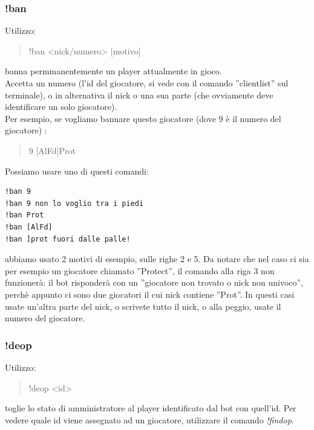 \documentclass[a4paper]{article}
\begin{document}
\subsubsection{!ban}
Utilizzo:
\begin{quote}
!ban \textless{}nick/numero\textgreater{} [motivo]
\end{quote}
banna permmanentemente un player attualmente in gioco.\\
Accetta un numero (l'id del giocatore, si vede con il comando ''clientlist'' sul terminale), o in alternativa il nick o una sua parte (che ovviamente deve identificare un solo giocatore).\\
Per esempio, se vogliamo bannare questo giocatore (dove 9 \`e il numero del giocatore) :
\begin{quote}
9 [AlFd]Prot
\end{quote}
Possiamo usare uno di questi comandi:
\begin{lstlisting}
!ban 9
!ban 9 non lo voglio tra i piedi
!ban Prot
!ban [AlFd]
!ban ]prot fuori dalle palle!
\end{lstlisting}
abbiamo usato 2 motivi di esempio, sulle righe 2 e 5.
Da notare che nel caso ci sia per esempio un giocatore chiamato ''Protect'', il comando alla riga 3 non funzioner\`a: il bot risponder\`a con un ''giocatore non trovato o nick non univoco'', perch\`e appunto ci sono due giocatori il cui nick contiene ''Prot''. In questi casi usate un'altra parte del nick, o scrivete tutto il nick, o alla peggio, usate il numero del giocatore.

\subsubsection{!deop}
Utilizzo:
\begin{quote}
!deop \textless{}id\textgreater{}
\end{quote}
toglie lo stato di amministratore al player identificato dal bot con quell'id. Per vedere quale id viene assegnato ad un giocatore, utilizzare il comando \textit{!findop}.
\end{document}
